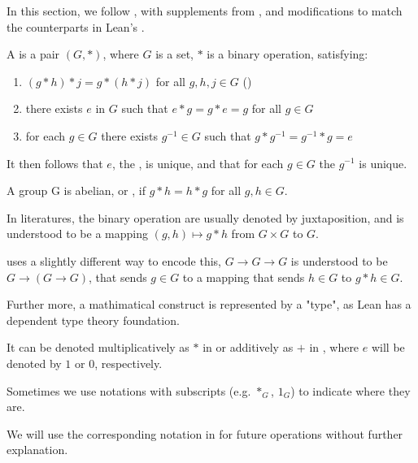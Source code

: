 
In this section, we follow \cite{jadczyk2019notes}, with supplements from \cite{garling2011clifford, chen2016infinitely}, 
and modifications to match the counterparts in Lean's \Mathlib.

\begin{definition}[Group]
    \label{Group}
    \leanok

    A  is a pair $(G, *)$, where $G$ is a set, $*$ is a binary operation, satisfying:

    \begin{enumerate}
    \item $(g * h) * j = g * (h * j)$ for all $g, h, j \in G$ ()
    \item there exists $e$ in $G$ such that $e * g = g * e = g$ for all $g \in G$
    \item for each $g \in G$ there exists $g^{-1} \in G$ such that $g * g^{-1} = g^{-1} * g = e$

    \end{enumerate}

\end{definition}

\begin{remark}
    \label{mk:Group}
    
    It then follows that $e$, the , is unique, and that for each $g \in G$ the  $g^{-1}$ is unique.

    A group G is abelian, or , if $g * h = h * g$ for all $g, h \in G$.

\end{remark}

\begin{remark}
    \label{mk:Notation}

    In literatures, the binary operation are usually denoted by juxtaposition, and is understood to be a mapping
    $(g, h) \mapsto g * h$ from $G \times G$ to $G$.
    
    \Mathlib uses a slightly different way to encode this, $G \to G \to G$ is understood to be $G \to (G \to G)$,
    that sends $g \in G$ to a mapping that sends $h \in G$ to $g * h \in G$.
    
    Further more, a mathimatical construct is represented by a "type", as Lean has a dependent type theory foundation. %
    
    It can be denoted multiplicatively as $*$ in 
    or additively as $+$ in , where $e$ will be denoted by $1$ or $0$, respectively.

    Sometimes we use notations with subscripts (e.g. $*_G$, $1_G$) to indicate where they are.

    We will use the corresponding notation in \Mathlib for future operations without further explanation.

\end{remark}

